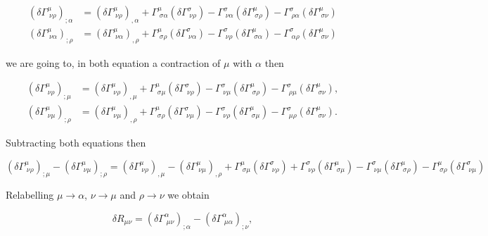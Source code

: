 \begin{align}
    (\delta\Gamma^{\mu}_{\;\nu\rho})_{;\alpha}&= (\delta \Gamma^{\mu}_{\;\nu\rho})_{,\alpha} + \Gamma^{\mu}_{\;\sigma\alpha}(\delta \Gamma^{\sigma}_{\;\nu\rho}) - \Gamma^{\sigma}_{\;\nu\alpha}(\delta\Gamma^{\mu}_{\;\sigma\rho}) - \Gamma^{\sigma}_{\;\rho\alpha}(\delta \Gamma^{\mu}_{\;\sigma\nu})\\
    (\delta\Gamma^{\mu}_{\;\nu\alpha})_{;\rho}&= (\delta \Gamma^{\mu}_{\;\nu\alpha})_{,\rho} + \Gamma^{\mu}_{\;\sigma\rho}(\delta \Gamma^{\sigma}_{\;\nu\alpha}) - \Gamma^{\sigma}_{\;\nu\rho}(\delta\Gamma^{\mu}_{\;\sigma\alpha}) - \Gamma^{\sigma}_{\;\alpha\rho}(\delta \Gamma^{\mu}_{\;\sigma\nu})
\end{align}

        we are going to, in both equation a contraction of $\mu$ with $\alpha$ then

        \begin{align}
            (\delta \Gamma^{\mu}_{\;\nu\rho})_{;\mu} &= (\delta \Gamma^{\mu}_{\;\nu\rho})_{,\mu} + \Gamma^{\mu}_{\;\sigma\mu}(\delta\Gamma^{\sigma}_{\;\nu\rho}) - \Gamma^{\sigma}_{\;\nu\mu}(\delta\Gamma^{\mu}_{\;\sigma\rho}) - \Gamma^{\sigma}_{\;\rho\mu}(\delta\Gamma^{\mu}_{\;\sigma\nu}),\\
            (\delta \Gamma^{\mu}_{\;\nu\mu})_{;\rho} &= (\delta \Gamma^{\mu}_{\;\nu\mu})_{,\rho} + \Gamma^{\mu}_{\;\sigma\rho}(\delta\Gamma^{\sigma}_{\;\nu\mu}) - \Gamma^{\sigma}_{\;\nu\rho}(\delta\Gamma^{\mu}_{\;\sigma\mu}) - \Gamma^{\sigma}_{\;\mu\rho}(\delta\Gamma^{\mu}_{\;\sigma\nu}).
        \end{align}

        Subtracting both equations  then

        \begin{equation}
            (\delta\Gamma^{\mu}_{\;\nu\rho})_{;\mu} - (\delta\Gamma^{\mu}_{\;\nu\mu})_{;\rho} = (\delta\Gamma^{\mu}_{\;\nu\rho})_{,\mu}-(\delta\Gamma^{\mu}_{\;\nu\mu})_{,\rho} + \Gamma^{\mu}_{\;\sigma\mu}(\delta\Gamma^{\sigma}_{\;\nu\rho}) + \Gamma^{\sigma}_{\;\nu\rho}(\delta\Gamma^{\mu}_{\;\sigma\mu}) - \Gamma^{\sigma}_{\;\nu\mu}(\delta\Gamma^{\mu}_{\;\sigma\rho}) -\Gamma^{\mu}_{\;\sigma\rho}(\delta\Gamma^{\sigma}_{\;\nu\mu})
        \end{equation}

        Relabelling $\mu\rightarrow\alpha$, $\nu\rightarrow\mu$ and $\rho\rightarrow\nu$ we obtain

        \begin{equation}
            \delta R_{\mu\nu} = (\delta\Gamma^{\alpha}_{\;\mu\nu})_{;\alpha} - (\delta\Gamma^{\alpha}_{\;\mu\alpha})_{;\nu},
        \end{equation}

